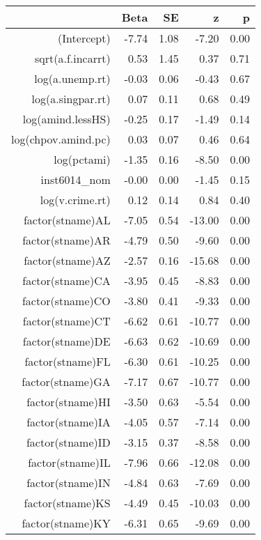 \begin{table}[ht]
\centering
\begin{tabular}{rrrrr}
  \hline
 & Beta & SE & z & p \\ 
  \hline
(Intercept) & -7.74 & 1.08 & -7.20 & 0.00 \\ 
  sqrt(a.f.incarrt) & 0.53 & 1.45 & 0.37 & 0.71 \\ 
  log(a.unemp.rt) & -0.03 & 0.06 & -0.43 & 0.67 \\ 
  log(a.singpar.rt) & 0.07 & 0.11 & 0.68 & 0.49 \\ 
  log(amind.lessHS) & -0.25 & 0.17 & -1.49 & 0.14 \\ 
  log(chpov.amind.pc) & 0.03 & 0.07 & 0.46 & 0.64 \\ 
  log(pctami) & -1.35 & 0.16 & -8.50 & 0.00 \\ 
  inst6014\_nom & -0.00 & 0.00 & -1.45 & 0.15 \\ 
  log(v.crime.rt) & 0.12 & 0.14 & 0.84 & 0.40 \\ 
  factor(stname)AL & -7.05 & 0.54 & -13.00 & 0.00 \\ 
  factor(stname)AR & -4.79 & 0.50 & -9.60 & 0.00 \\ 
  factor(stname)AZ & -2.57 & 0.16 & -15.68 & 0.00 \\ 
  factor(stname)CA & -3.95 & 0.45 & -8.83 & 0.00 \\ 
  factor(stname)CO & -3.80 & 0.41 & -9.33 & 0.00 \\ 
  factor(stname)CT & -6.62 & 0.61 & -10.77 & 0.00 \\ 
  factor(stname)DE & -6.63 & 0.62 & -10.69 & 0.00 \\ 
  factor(stname)FL & -6.30 & 0.61 & -10.25 & 0.00 \\ 
  factor(stname)GA & -7.17 & 0.67 & -10.77 & 0.00 \\ 
  factor(stname)HI & -3.50 & 0.63 & -5.54 & 0.00 \\ 
  factor(stname)IA & -4.05 & 0.57 & -7.14 & 0.00 \\ 
  factor(stname)ID & -3.15 & 0.37 & -8.58 & 0.00 \\ 
  factor(stname)IL & -7.96 & 0.66 & -12.08 & 0.00 \\ 
  factor(stname)IN & -4.84 & 0.63 & -7.69 & 0.00 \\ 
  factor(stname)KS & -4.49 & 0.45 & -10.03 & 0.00 \\ 
  factor(stname)KY & -6.31 & 0.65 & -9.69 & 0.00 \\ 

\end{tabular}
\end{table}
